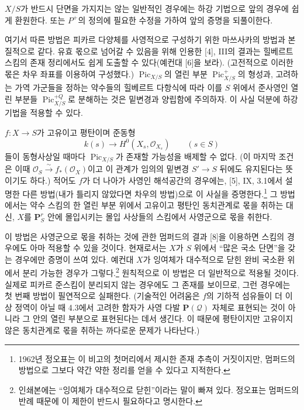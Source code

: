 $X/S$가 반드시 단면을 가지지는 않는 일반적인 경우에는 하강 기법으로
앞의 경우에 쉽게 환원한다. 또는 $P^+$의 정의에 필요한 수정을 가하여
앞의 증명을 되풀이한다.

 여기서 따른 방법은 피카르 다양체를 사영적으로 구성하기
위한 마쓰사카의 방법과 본질적으로 같다. 유효 몫으로 넘어갈 수 있음을 위해
인용한 [4], III의 결과는 힐베르트 스킴의 존재 정리에서도 쉽게 도출할 수
있다(예컨대 [6]을 보라). (고전적으로 이러한 몫은 차우 좌표를 이용하여
구성했다.) $\operatorname{Pic}_{X/S}$의 열린 부분
$\operatorname{Pic}^{+}_{X/S}$의 형성과, 고려하는 가역 가군들을 정하는
약수들의 힐베르트 다항식에 따라 이를 $S$ 위에서 준사영인 열린 부분들
$\operatorname{Pic}^{+Q}_{X/S}$로 분해하는 것은 밑변경과 양립함에
주의하자. 이 사실 덕분에 하강 기법을 적용할 수 있다.

 $f:X\longrightarrow S$가 고유이고 평탄이며 준동형
\[
k(s)\longrightarrow H^0(X_s,\mathcal O_{X_s})\qquad(s\in S)
\]
들이 동형사상일 때마다 $\operatorname{Pic}_{X/S}$가 존재할 가능성을
배제할 수 없다. (이 마지막 조건은 이때
$\mathcal O_S\xrightarrow{\sim}f_*(\mathcal O_X)$이고 이 관계가 임의의
밑변경 $S'\longrightarrow S$ 뒤에도 유지된다는 뜻이기도 하다.) 적어도
$f$가 더 나아가 사영인 해석공간의 경우에는, [5], IX, 3.1에서 설명한
다른 방법(내가 틀리지 않았다면 차우의 방법)으로 이 사실을
증명한다.\footnote{1962년 정오표는 이 비고의 첫머리에서 제시한 존재
추측이 거짓이지만, 멈퍼드의 방법으로 그보다 약간 약한 정리를 얻을 수
있다고 지적한다.} 그 방법에서는 약수 스킴의 한 열린 부분 위에서 고유이고
평탄인 동치관계로 몫을 취하는 대신, $X$를 $\mathbf P^r_S$ 안에
몰입시키는 몰입 사상들의 스킴에서 사영군으로 몫을 취한다.

이 방법은 사영군으로 몫을 취하는 것에 관한 멈퍼드의 결과 [8]을 이용하면
스킴의 경우에도 아마 적용할 수 있을 것이다. 현재로서는 $X$가 $S$ 위에서
``많은 국소 단면''을 갖는 경우에만 증명이 쓰여 있다. 예컨대 $X$가
잉여체가 대수적으로 닫힌 완비 국소환 위에서 분리 가능한 경우가
그렇다.\footnote{인쇄본에는 ``잉여체가 대수적으로 닫힌''이라는 말이
빠져 있다. 정오표는 멈퍼드의 반례 때문에 이 제한이 반드시 필요하다고
명시한다.} 원칙적으로 이 방법은 더 일반적으로 적용될 것이다. 실제로
피카르 준스킴이 분리되지 않는 경우에도 그 존재를 보이므로, 그런 경우에는
첫 번째 방법이 필연적으로 실패한다. (기술적인 어려움은 $f$의 기하적
섬유들이 더 이상 정역이 아닐 때 4.3에서 고려한 함자가 사영 다발
$\mathbf P(\mathcal Q)$ 자체로 표현되는 것이 아니라 그 안의 열린 부분으로
표현된다는 데서 생긴다. 이 때문에 평탄이지만 고유이지 않은 동치관계로
몫을 취하는 까다로운 문제가 나타난다.)


